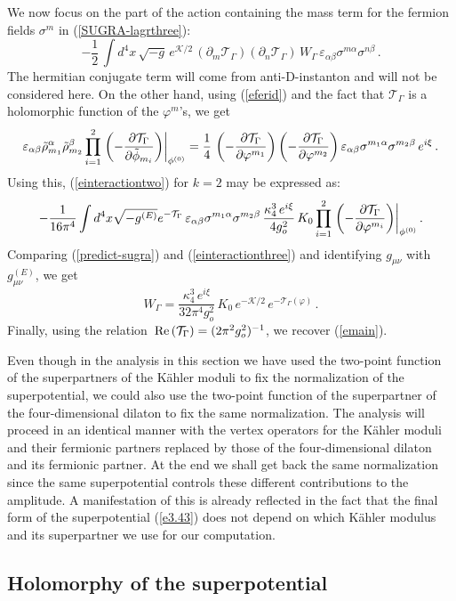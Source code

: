 \documentclass[12pt,a4paper]{article}
\newcommand{\be}{\begin{equation}}
\newcommand{\ee}{\end{equation}}
\newcommand{\refb}[1]{(\ref{#1})}
\newcommand{\p}{\partial}
\def\Re{\,{\rm Re}\,}
\def\({\left(}
\def\){\right)}
\newcommand{\vp}{\varphi}
\newcommand{\ve}{\varepsilon}
\newcommand{\cK}{\mathcal{K}}
\newcommand{\cT}{\mathcal{T}}
\def\KKZ{K_0}
\newcommand{\Chi}{\sigma}
\begin{document}
We now focus on the part of the action containing the
mass term for the fermion fields $\Chi^m$ in \refb{SUGRA-lagrthree}:
\be\label{predict-sugra}
-\frac{1}{2}\, \int d^4 x\, \sqrt{-  g}\, e^{\cK/2}\, (\p_m \cT_\Gamma) (\p_n \cT_\Gamma) \,
W_\Gamma  \, \ve_{\alpha\beta} \Chi^{m\alpha}\Chi^{n\beta}\, .
\ee
The hermitian conjugate term will come from anti-D-instanton and will not be
considered here.
On the other hand, using \refb{eferid} and the fact that $\cT_\Gamma$ is a holomorphic function
of the $\vp^m$'s, we get
\be\label{erelation}
\ve_{\alpha\beta} \tilde\rho_{m_1}^\alpha \tilde\rho_{m_2}^\beta
\prod_{i=1}^2 \left.\left(-{\p \cT_\Gamma\over \p \tilde\phi_{m_i}}\right) \right|_{\phi^{(0)}}
= {1\over 4} \, \(-{\p\cT_\Gamma\over \p \vp^{m_1}}\) \(-{\p\cT_\Gamma\over \p \vp^{m_2}}\)
\ve_{\alpha\beta} \Chi^{m_1\alpha} \Chi^{m_2\beta}\, e^{i\xi}\, .
\ee
Using this, \refb{einteractiontwo} for $k=2$ may be expressed as:
\be \label{einteractionthree}
-{1 \over 16\pi^4} \int d^4 x \sqrt{-  g^{(E)}}e^{-\cT_\Gamma}\,
\ve_{\alpha\beta} \Chi^{m_1\alpha} \Chi^{m_2\beta}\,
{\kappa_4^3 \, e^{i\xi}\over 4 g_o^{2}} \, \KKZ
\prod_{i=1}^2 \left.\left(- {\p \cT_\Gamma \over \p \vp^{m_i}}
\right) \right|_{\phi^{(0)}}.
\ee
Comparing \refb{predict-sugra} and \refb{einteractionthree} and identifying
$g_{\mu\nu}$ with $g^{(E)}_{\mu\nu}$, we get
\be\label{e3.43}
W_\Gamma  =\frac{\kappa_4^3\, e^{i\xi}}{32\pi^{4}g_o^2}
\, K_0\, e^{-\cK/2}\, e^{-\cT_\Gamma(\vp)}\, .
\ee
Finally, using the relation $\Re(\cT_\Gamma)=(2\pi^2 g_o^2)^{-1}$, we recover \refb{emain}.

Even though in the analysis in this section we have used the two-point function of
the superpartners of the K\"ahler moduli to fix the normalization of the superpotential, we could
also use the two-point function of the superpartner of the four-dimensional dilaton to
fix the same normalization. The analysis will proceed in an identical manner with the vertex
operators for the K\"ahler moduli and their fermionic partners replaced by those of the
four-dimensional dilaton and its fermionic partner. At the end we shall get back the same
normalization since the same superpotential controls these different contributions to the
amplitude. A manifestation of this is already reflected in the fact that the final form
of the superpotential \refb{e3.43} does not depend on which K\"ahler modulus and its
superpartner we use for our computation.


\subsection{Holomorphy of the superpotential}
\end{document}
